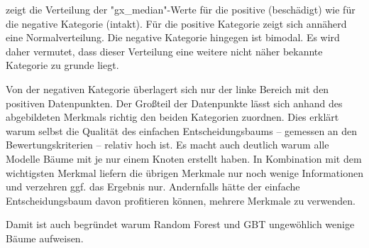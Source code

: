  zeigt die Verteilung der "gx\_median"-Werte für die positive (beschädigt) wie für die negative Kategorie (intakt). Für die positive Kategorie zeigt sich annäherd eine Normalverteilung. Die negative Kategorie hingegen ist bimodal. Es wird daher vermutet, dass dieser Verteilung eine weitere nicht näher bekannte Kategorie zu grunde liegt.

Von der negativen Kategorie überlagert sich nur der linke Bereich mit den positiven Datenpunkten. Der Großteil der Datenpunkte lässt sich anhand des abgebildeten Merkmals richtig den beiden Kategorien zuordnen. Dies erklärt warum selbst die Qualität des einfachen Entscheidungsbaums -- gemessen an den Bewertungskriterien -- relativ hoch ist. Es macht auch deutlich warum alle Modelle Bäume mit je nur einem Knoten erstellt haben. In Kombination mit dem wichtigsten Merkmal liefern die übrigen Merkmale nur noch wenige Informationen und verzehren ggf. das Ergebnis nur. Andernfalls hätte der einfache Entscheidungsbaum davon profitieren können, mehrere Merkmale zu verwenden.

Damit ist auch begründet warum Random Forest und GBT ungewöhlich wenige Bäume aufweisen.